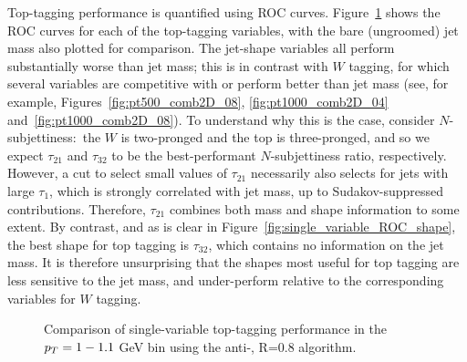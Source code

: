 Top-tagging performance is quantified using ROC curves. Figure~\ref{fig:single_variable_ROC} shows the ROC curves for each of the top-tagging variables, with the bare (ungroomed) jet mass also plotted for comparison. The jet-shape variables all perform substantially worse than jet mass; this is in contrast with $W$ tagging, for which several variables are competitive with or perform better than jet mass (see, for example, Figures~\ref{fig:pt500_comb2D_08}, \ref{fig:pt1000_comb2D_04} and~\ref{fig:pt1000_comb2D_08}).
To understand why this is the case, consider $N$-subjettiness:~the $W$ is two-pronged and the top is three-pronged, and so we expect $\tau_{21}$ and $\tau_{32}$ to be the best-performant $N$-subjettiness ratio, respectively. However, a cut to select small values of $\tau_{21}$  necessarily also selects for 
jets with large $\tau_1$, which is strongly correlated with jet mass, up to Sudakov-suppressed contributions. Therefore, $\tau_{21}$ combines both mass and shape information to some extent. By contrast, and as is clear in Figure~\ref{fig:single_variable_ROC_shape}, the best shape for top tagging is $\tau_{32}$, which contains no information on the jet mass. It is therefore unsurprising that the  shapes most useful for top tagging are less sensitive to the jet mass, and under-perform relative to the corresponding variables for $W$ tagging.

\begin{figure}
\centering
{}
\caption{Comparison of single-variable top-tagging performance in the $p_T= 1-1.1$ GeV bin using the anti-\kT, R=0.8 algorithm.}
\label{fig:single_variable_ROC}
\end{figure}

